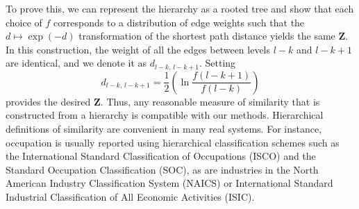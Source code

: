 \documentclass[aps,pre,floats,floatfix,superscriptaddress,twocolumn,final,10pt]{revtex4-2}
\theoremstyle{definition}
\renewcommand{\vec}[1]{\mathbf{#1}}
\begin{document}
To prove this, we can represent the hierarchy as a rooted tree and show that each choice of $f$ corresponds to a distribution of edge weights such that the $d \mapsto \exp(-d)$ transformation of the shortest path distance yields the same $\vec{Z}$. In this construction, the weight of all the edges between levels $l-k$ and $l-k+1$ are identical, and we denote it as $d_{l-k,\,l-k+1}$. Setting 
\begin{equation}
    d_{l-k, \,l-k+1}=\frac{1}{2} \left( \ln \frac{f(l-k+1)}{f(l-k)} \right)    
\end{equation}
provides the desired $\vec{Z}$. Thus, any reasonable measure of similarity that is constructed from a hierarchy is compatible with our methods. Hierarchical definitions of similarity are convenient in many real systems. For instance, occupation is usually reported using hierarchical classification schemes such as the International Standard Classification of Occupations (ISCO) and the Standard Occupation Classification (SOC), as are industries in the North American Industry Classification System (NAICS) or International Standard Industrial Classification of All Economic Activities (ISIC).
\end{document}
